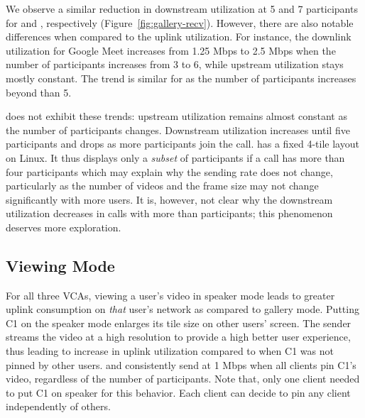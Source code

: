 We observe a similar reduction in downstream utilization at 5 and 7
participants for \zoom and \meet, respectively
(Figure~\ref{fig:gallery-recv}). However, there are also notable differences
when compared to the uplink utilization. For instance, the downlink
utilization for Google Meet increases from 1.25 Mbps to 2.5 Mbps when the
number of participants increases from 3 to 6, while upstream utilization stays
mostly constant. The trend is similar for \zoom as the number of participants
increases beyond than 5. 

\teams does not exhibit these trends: upstream utilization remains almost
constant as the number of participants changes. Downstream utilization
increases until five participants and drops as more participants join the call.
\teams has a fixed 4-tile layout on Linux. It thus displays
only a {\em subset} of participants if a call has more than four participants
which
may explain why the sending rate does not change, particularly as the number
of videos and the frame size may not
change significantly with more users. It is, however, not clear why the
downstream utilization decreases in calls with more than participants; this
phenomenon deserves more exploration. 

\subsection{Viewing Mode}

For all three VCAs, viewing a user's video in speaker mode leads to greater
uplink consumption on {\em that} user's network as compared to gallery mode.
Putting C1 on the speaker mode enlarges its tile size on other users' screen.
The sender streams the video at a high resolution to provide a high better user experience,
thus leading to increase in uplink utilization compared to when C1
was not pinned by other users. \zoom and \meet consistently send at 1 Mbps
when all clients pin C1's video, regardless of the number of participants.
Note that, only one client needed to put C1 on speaker for this behavior. Each
client can decide to pin any client independently of others.


